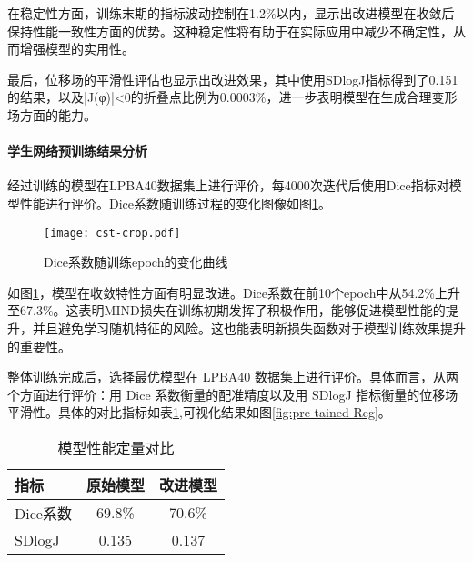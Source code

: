 在稳定性方面，训练末期的指标波动控制在1.2\%以内，显示出改进模型在收敛后保持性能一致性方面的优势。这种稳定性将有助于在实际应用中减少不确定性，从而增强模型的实用性。

最后，位移场的平滑性评估也显示出改进效果，其中使用SDlogJ指标得到了0.151的结果，以及|J(φ)|<0的折叠点比例为0.0003\%，进一步表明模型在生成合理变形场方面的能力。

\paragraph{学生网络预训练结果分析}

经过训练的模型在LPBA40数据集上进行评价，每4000次迭代后使用Dice指标对模型性能进行评价。Dice系数随训练过程的变化图像如图\ref{fig:cstloss}。

\begin{figure}[h]
    \centering
    \texttt{[image: cst-crop.pdf]}
    \caption{Dice系数随训练epoch的变化曲线}
    \label{fig:cstloss}
\end{figure}

如图\ref{fig:cstloss}，模型在收敛特性方面有明显改进。Dice系数在前10个epoch中从54.2\%上升至67.3\%。这表明MIND损失在训练初期发挥了积极作用，能够促进模型性能的提升，并且避免学习随机特征的风险。这也能表明新损失函数对于模型训练效果提升的重要性。

整体训练完成后，选择最优模型在 LPBA40 数据集上进行评价。具体而言，从两个方面进行评价：用 Dice 系数衡量的配准精度以及用 SDlogJ 指标衡量的位移场平滑性。具体的对比指标如表\ref{tab:CSTresult},可视化结果如图\ref{fig:pre-tained-Reg}。

\begin{table}[h]
    \centering
    \caption{模型性能定量对比}
    \label{tab:CSTresult}
    \begin{tabular}{lcc}
        \toprule
        \textbf{指标} & \textbf{原始模型} & \textbf{改进模型} \\
        \midrule
        Dice系数      & 69.8\%        & 70.6\%        \\
        SDlogJ      & 0.135         & 0.137         \\
        \bottomrule
    \end{tabular}
\end{table}

